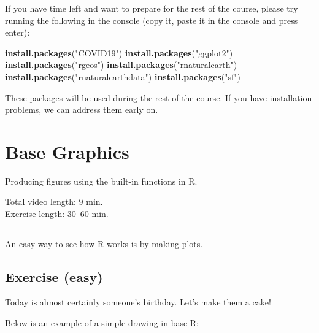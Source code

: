 \documentclass[
]{book}
\newenvironment{Shaded}{\begin{snugshade}}{\end{snugshade}}
\newcommand{\FunctionTok}[1]{\textcolor[rgb]{0.13,0.29,0.53}{\textbf{#1}}}
\newcommand{\NormalTok}[1]{#1}
\newcommand{\StringTok}[1]{\textcolor[rgb]{0.31,0.60,0.02}{#1}}
\begin{document}
If you have time left and want to prepare for the rest of the course, please try running the following in the \href{https://youtu.be/AHAR7j-IUOw?t=133}{console} (copy it, paste it in the console and press enter):

\begin{Shaded}
\begin{Highlighting}[]
\FunctionTok{install.packages}\NormalTok{(}\StringTok{"COVID19"}\NormalTok{)}
\FunctionTok{install.packages}\NormalTok{(}\StringTok{"ggplot2"}\NormalTok{)}
\FunctionTok{install.packages}\NormalTok{(}\StringTok{"rgeos"}\NormalTok{)}
\FunctionTok{install.packages}\NormalTok{(}\StringTok{"rnaturalearth"}\NormalTok{)}
\FunctionTok{install.packages}\NormalTok{(}\StringTok{"rnaturalearthdata"}\NormalTok{)}
\FunctionTok{install.packages}\NormalTok{(}\StringTok{"sf"}\NormalTok{)}
\end{Highlighting}
\end{Shaded}

These packages will be used during the rest of the course. If you have installation problems, we can address them early on.

\hypertarget{base-graphics}{%
\chapter{Base Graphics}\label{base-graphics}}

Producing figures using the built-in functions in R.

Total video length: 9 min.\\
Exercise length: 30--60 min.

\begin{center}\rule{0.5\linewidth}{0.5pt}\end{center}

An easy way to see how R works is by making plots.

\hypertarget{exercise-easy}{%
\section{Exercise (easy)}\label{exercise-easy}}

Today is almost certainly someone's birthday. Let's make them a cake!

Below is an example of a simple drawing in base R:
\end{document}
